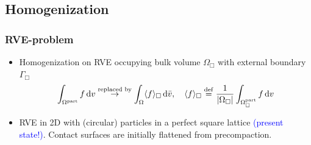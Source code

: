 \documentclass[11pt]{beamer} %
\begin{document}
\subsection{Homogenization}
\begin{frame}
 \frametitle{RVE-problem}
\begin{itemize}
 \item Homogenization on RVE occupying bulk volume $\Omega_\Box$ with external boundary $\Gamma_\Box$
 \begin{align*}
  \int_{\Omega^{\mathrm{part}}} f \operatorname{d \!} v \stackrel{\text{replaced by}}{\to} \int_\Omega \langle f\rangle_\Box \operatorname{d \!} \bar{v}, \quad \langle f\rangle_\Box \overset{\mathrm{def}}{=} \frac1{|\Omega_\Box|} \int_{\Omega_\Box^{\mathrm{part}}} f \operatorname{d \!} v
 \end{align*}
 \item RVE in 2D with (circular) particles in a perfect square lattice \textcolor{blue}{(present state!)}. Contact surfaces are initially flattened from precompaction.
\end{itemize}
 \begin{center}
  \begin{columns}
   \centering
    \resizebox{!}{0.8\textwidth}{}
  \end{columns}
 \end{center}
\end{frame}
\end{document}
